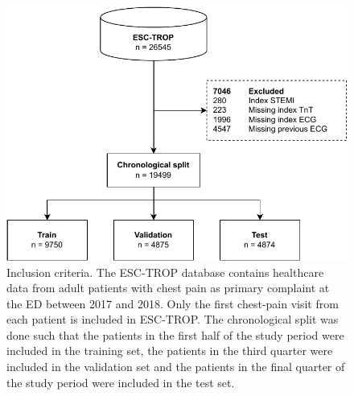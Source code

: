 \documentclass[preprint]{elsarticle}
\begin{document}
\begin{figure}[h!]
\includegraphics[width=\linewidth]{figures/inclusioncriteria.pdf}
\centering
\caption{Inclusion criteria. The ESC-TROP database contains healthcare data from adult patients with chest pain as primary complaint at the ED between 2017 and 2018. Only the first chest-pain visit from each patient is included in ESC-TROP. The chronological split was done such that the patients in the first half of the study period were included in the training set, the patients in the third quarter were included in the validation set and the patients in the final quarter of the study period were included in the test set.}
\label{fig:inclusion}
\end{figure}
\end{document}
